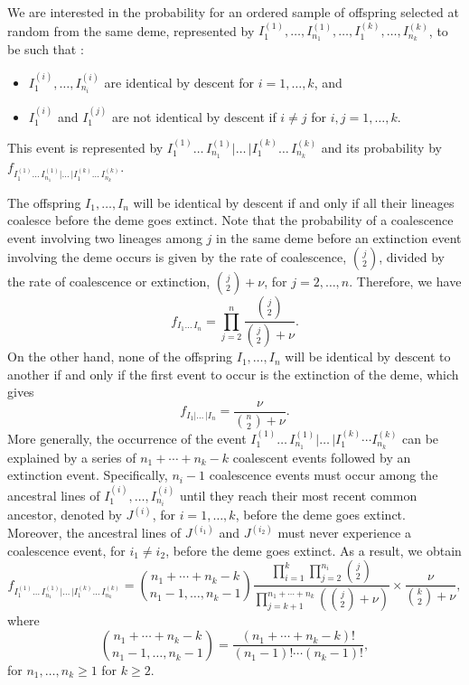 \documentclass[11pt]{article}
\begin{document}
We are interested in the probability for an ordered sample of offspring selected at random from the same deme, represented by $I^{(1)}_1,\ldots,I^{(1)}_{n_1},\ldots,I^{(k)}_1,\ldots, I^{(k)}_{n_k}$, to be such that :
\begin{itemize}
\item $I^{(i)}_1,\ldots,I^{(i)}_{n_i}$ are identical by descent for $i=1,\ldots,k$, and
\item $I^{(i)}_1$ and $I^{(j)}_1$ are not identical by descent if $i\neq j$ for $i,j=1,\ldots,k$.
\end{itemize}
This event is represented by $I^{(1)}_1\ldots \, I^{(1)}_{n_1}|\ldots \,|I^{(k)}_1\ldots \,  I^{(k)}_{n_k}$ and its probability by $f_{I^{(1)}_1\ldots \, I^{(1)}_{n_1}|\ldots \,|I^{(k)}_1\ldots \, I^{(k)}_{n_k}}$.


The offspring $I_1,\ldots, I_{n}$  will be identical by descent if and only if all their lineages coalesce before the deme goes extinct. Note that the probability of a coalescence event involving two lineages among $j$ in the same deme before an extinction event involving the deme occurs is given by the rate of coalescence, $\binom{j}{2}$, divided by the rate of coalescence or extinction, $\binom{j}{2}+\nu$, 
for $j=2, \ldots, n$. Therefore, we have
\begin{equation}\label{B-eq1}
f_{I_1\ldots  \,I_{n}}=\prod_{j=2}^{n}\frac{\binom{j}{2}}{\binom{j}{2}+\nu}.
\end{equation}
On the other hand, none of the offspring 
$I_1,\ldots, I_{n}$ will be identical by descent to another if and only if the first event to occur is the extinction of the deme, which gives
\begin{equation}\label{B-eq2}
f_{I_1|\ldots \, |I_{n}}=\frac{\nu}{\binom{n}{2}+\nu}.
\end{equation}
More generally, the occurrence of the event $I^{(1)}_1\ldots \,I^{(1)}_{n_1}|\ldots \, |I^{(k)}_1\cdots I^{(k)}_{n_k}$ can be explained by a series of $n_1+\cdots+n_k-k$ coalescent events followed by an extinction event. Specifically, $n_i-1$ coalescence events must occur among the ancestral lines of $I^{(i)}_1,\ldots,I^{(i)}_{n_i}$ until they reach their most recent common ancestor, denoted by $J^{(i)}$, for $i=1,\ldots,k$, before the deme goes extinct. 
Moreover, the ancestral lines of $J^{(i_1)}$ and $J^{(i_2)}$ must never experience a coalescence event, for $i_1\not=i_2$, before the deme goes extinct. As a result, we obtain
\begin{equation}\label{B-eq3}
f_{I^{(1)}_1\ldots \, I^{(1)}_{n_1}|\ldots \, |I^{(k)}_1\ldots \, I^{(k)}_{n_k}}=\binom{n_1+\cdots+n_k-k}{n_1-1,\ldots,n_k-1}\frac{\prod_{i=1}^{k}\prod_{j=2}^{n_i}\binom{j}{2}}
{\prod_{j=k+1}^{n_1+\cdots+n_k}\left(\binom{j}{2}+\nu\right)}\times\frac{\nu}{\binom{k}{2}+\nu},
\end{equation}
where
\begin{equation}\label{B-eq4}
\binom{n_1+\cdots+n_k-k}{n_1-1,\ldots,n_k-1}=\dfrac{(n_1+\cdots+n_k-k)!}{(n_1-1)!\cdots( n_k-1)!},
\end{equation}
for $n_1, \ldots, n_k \geq 1$ for $k\geq2$.
\end{document}
